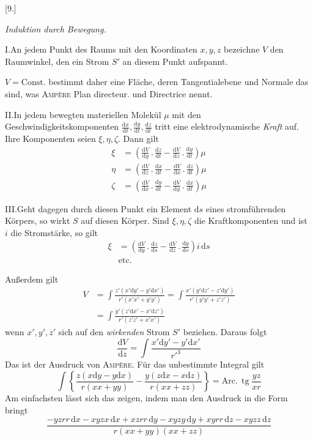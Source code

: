 \begin{center}[9.]\par\medskip\textit{Induktion durch Bewegung.}\end{center}
I.\quad An jedem Punkt des Raums mit den Koordinaten $x,y,z$ bezeichne $V$ den Raumwinkel, den ein Strom $S'$ an diesem Punkt aufspannt.

$V=\text{Const.}$ bestimmt daher eine Fläche, deren Tangentialebene und Normale das sind, was \textsc{Ampère} Plan directeur. und Directrice nennt.

II.\quad In jedem bewegten materiellen Molekül $\mu$ mit den Geschwindigkeitskomponenten $\frac{\mathrm dx}{\mathrm dt},\frac{\mathrm dy}{\mathrm dt},\frac{\mathrm dz}{\mathrm dt}$ tritt eine elektrodynamische \textit{Kraft} auf. Ihre Komponenten seien $\xi,\eta,\zeta$. Dann gilt
\[
\begin{aligned}
\xi&=\left(\frac{\mathrm dV}{\mathrm dy}\,.\,\frac{\mathrm dz}{\mathrm dt}-\frac{\mathrm dV}{\mathrm dz}\,.\,\frac{\mathrm dy}{\mathrm dt}\right)\mu\\[4pt]
\eta&=\left(\frac{\mathrm dV}{\mathrm dz}\,.\,\frac{\mathrm dx}{\mathrm dt}-\frac{\mathrm dV}{\mathrm dx}\,.\,\frac{\mathrm dz}{\mathrm dt}\right)\mu\\[4pt]
\zeta&=\left(\frac{\mathrm dV}{\mathrm dx}\,.\,\frac{\mathrm dy}{\mathrm dt}-\frac{\mathrm dV}{\mathrm dy}\,.\,\frac{\mathrm dx}{\mathrm dt}\right)\mu
\end{aligned}
\]

III.\quad Geht dagegen durch diesen Punkt ein Element $\mathrm ds$ eines stromführenden Körpers, so wirkt $S$ auf diesen Körper. Sind $\xi,\eta,\zeta$ die Kraftkomponenten und ist $i$ die Stromstärke, so gilt
\[
\begin{aligned}
\xi&=\left(\frac{\mathrm dV}{\mathrm dy}\,.\,\frac{\mathrm dz}{\mathrm ds}-\frac{\mathrm dV}{\mathrm dz}\,.\,\frac{\mathrm dy}{\mathrm ds}\right)i\,\mathrm ds\\
&\text{etc.}
\end{aligned}
\]

Außerdem gilt
\[
\begin{aligned}
V&=\int\frac{z'(x'\mathrm dy'-y'\mathrm dx')}{r'(x'x'+y'y')}=\int\frac{x'(y'\mathrm dz'-z'\mathrm dy')}{r'(y'y'+z'z')}\\
&=\int\frac{y'(z'\mathrm dx'-x'\mathrm dz')}{r'(z'z'+x'x')}
\end{aligned}
\]
wenn $x',y',z'$ sich auf den \textit{wirkenden} Strom $S'$ beziehen. Daraus folgt
\[
\frac{\mathrm dV}{\mathrm dz}=\int\frac{x'\mathrm dy'-y'\mathrm dx'}{r'^3}
\]
Das ist der Ausdruck von \textsc{Ampère}. Für das unbestimmte Integral gilt
\[
\int\left\{\frac{z(x\mathrm dy-y\mathrm dx)}{r(xx+yy)}-\frac{y(z\mathrm dx-x\mathrm dz)}{r(xx+zz)}\right\}=\text{Arc.}\,\operatorname{tg}\frac{yz}{xr}
\]
Am einfachsten lässt sich das zeigen, indem man den Ausdruck in die Form bringt
\[
\frac{-yzrr\,\mathrm dx-xyzx\,\mathrm dx+xzrr\,\mathrm dy-xyzy\,\mathrm dy+xyrr\,\mathrm dz-xyzz\,\mathrm dz}{r(xx+yy)(xx+zz)}
\]

